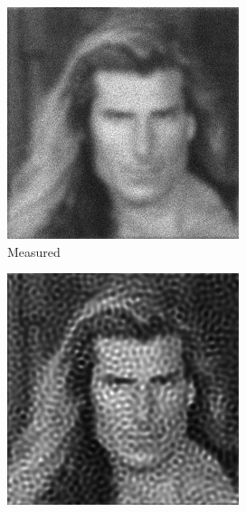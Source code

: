 \documentclass{juliacon}
\begin{document}
        \begin{figure}[h]
            \begin{subfigure}[b]{.166\textwidth}
                \centering
                \includegraphics[width=\textwidth]{figures/fabio_blurry.png}
                \caption{Measured}
                \label{fig:fabioa}
            \end{subfigure}%
            \begin{subfigure}[b]{.166\textwidth}
                \centering
                \includegraphics[width=\textwidth]{figures/fabio_deconv_no_reg_iter_30.png}

\end{subfigure}
\end{figure}
\end{document}
